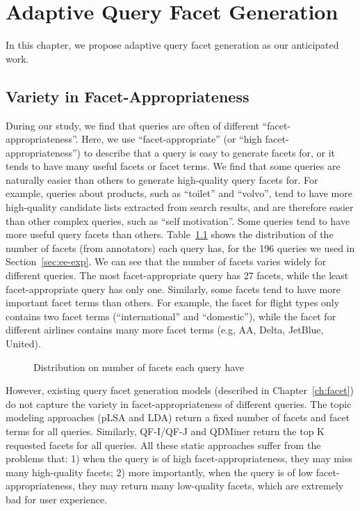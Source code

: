 \chapter{Adaptive Query Facet Generation} \label{ch:anticipated}
In this chapter, we propose adaptive query facet generation as our anticipated work.

\section{Variety in Facet-Appropriateness}
During our study, we find that queries are often of different ``facet-appropriateness''. Here, we use ``facet-appropriate'' (or ``high facet-appropriateness'') to describe that a query is easy to generate facets for, or it tends to have many useful facets or facet terms. We find that some queries are naturally easier than others to generate high-quality query facets for. For example, queries about products, such as ``toilet'' and ``volvo'', tend to have more high-quality candidate lists extracted from search results, and are therefore easier than other complex queries, such as ``self motivation''.
Some queries tend to have more useful query facets than others.
Table~\ref{fig:nfacets} shows the distribution of the number of facets (from annotators) each query has, for the 196 queries we used in Section~\ref{sec:ee-exp}. We can see that the number of facets varies widely for different queries. The most facet-appropriate query has 27 facets, while the least facet-appropriate query has only one.
Similarly, some facets tend to have more important facet terms than others.
For example, the facet for flight types only contains two facet terms (``international'' and ``domestic''), while the facet for different airlines contains many more facet terms (e.g, AA, Delta, JetBlue, United).
\begin{figure}[ht!]
\centering
{}
\caption{Distribution on number of facets each query have}
\label{fig:nfacets}
\end{figure}


However, existing query facet generation models (described in Chapter~\ref{ch:facet}) do not capture the variety in facet-appropriateness of different queries. The topic modeling approaches (pLSA and LDA) return a fixed number of facets and facet terms for all queries. Similarly, QF-I/QF-J and QDMiner return the top K requested facets for all queries.
All these static approaches suffer from the problems that: 1) when the query is of high facet-appropriateness, they may miss many high-quality facets; 2) more importantly, when the query is of low facet-appropriateness, they may return many low-quality facets, which are extremely bad for user experience. 

